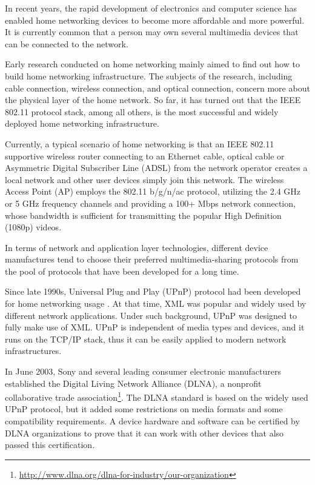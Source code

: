 In recent years, the rapid development of electronics and computer science has
enabled home networking devices to become more affordable and more powerful. It
is currently common that a person may own several multimedia devices that
can be connected to the network.

Early research \cite{link_layer_old} \cite{end_user} \cite{link_layer}
conducted on home networking mainly aimed to find out how to build home
networking infrastructure. The subjects of the research, including cable
connection, wireless connection, and optical connection, concern more about
the physical layer of the home network.  So far, it has turned out that the
IEEE 802.11 protocol stack, among all others, is the most successful and 
widely deployed home networking infrastructure.

Currently, a typical scenario of home networking is that an IEEE 802.11
supportive wireless router connecting to an Ethernet cable, optical cable or
Asymmetric Digital Subscriber Line (ADSL) from the network operator creates
a local network and other user devices simply join this network. The wireless
Access Point (AP) employs the 802.11 b/g/n/ac protocol, utilizing the 2.4 GHz
or 5 GHz frequency channels and providing a 100+ Mbps  network connection,
whose bandwidth is sufficient for transmitting the popular High Definition
(1080p) videos.

In terms of network and application layer technologies, different device 
manufactures tend to choose their preferred multimedia-sharing protocols from
the pool of protocols that have been developed for a long time.

Since late 1990s, Universal Plug and Play (UPnP) protocol had been developed for
home networking usage \cite{upnp}. At that time, XML was popular and widely
used by different network applications. Under such background, UPnP was designed
to fully make use of XML. UPnP is independent of media types and devices, and it
runs on the TCP/IP stack, thus it can be easily applied to modern network
infrastructures.

In June 2003, Sony and several leading consumer electronic manufacturers
established the Digital Living Network Alliance (DLNA), a nonprofit 
collaborative trade association\footnote{\url{http://www.dlna.org/dlna-for-industry/our-organization}}. The
DLNA standard is based on the widely used UPnP protocol, but it added some
restrictions on media formats and some compatibility requirements. A device
hardware and software can be certified by DLNA organizations to prove that it
can work with other devices that also passed this certification.

